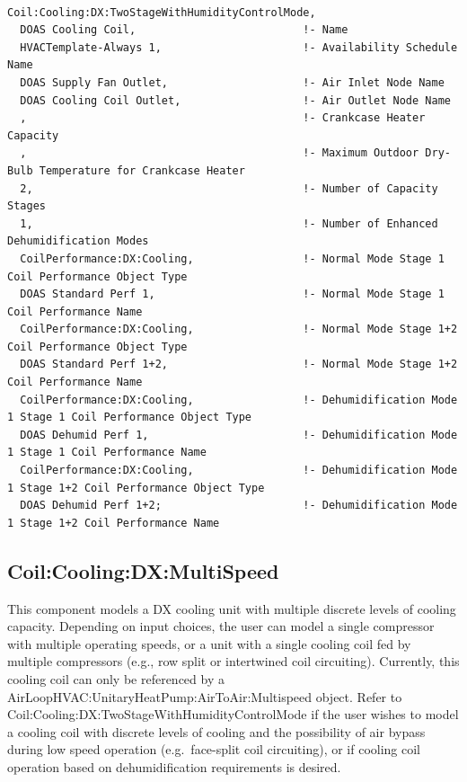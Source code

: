 \begin{lstlisting}

Coil:Cooling:DX:TwoStageWithHumidityControlMode,
  DOAS Cooling Coil,                          !- Name
  HVACTemplate-Always 1,                      !- Availability Schedule Name
  DOAS Supply Fan Outlet,                     !- Air Inlet Node Name
  DOAS Cooling Coil Outlet,                   !- Air Outlet Node Name
  ,                                           !- Crankcase Heater Capacity
  ,                                           !- Maximum Outdoor Dry-Bulb Temperature for Crankcase Heater
  2,                                          !- Number of Capacity Stages
  1,                                          !- Number of Enhanced Dehumidification Modes
  CoilPerformance:DX:Cooling,                 !- Normal Mode Stage 1 Coil Performance Object Type
  DOAS Standard Perf 1,                       !- Normal Mode Stage 1 Coil Performance Name
  CoilPerformance:DX:Cooling,                 !- Normal Mode Stage 1+2 Coil Performance Object Type
  DOAS Standard Perf 1+2,                     !- Normal Mode Stage 1+2 Coil Performance Name
  CoilPerformance:DX:Cooling,                 !- Dehumidification Mode 1 Stage 1 Coil Performance Object Type
  DOAS Dehumid Perf 1,                        !- Dehumidification Mode 1 Stage 1 Coil Performance Name
  CoilPerformance:DX:Cooling,                 !- Dehumidification Mode 1 Stage 1+2 Coil Performance Object Type
  DOAS Dehumid Perf 1+2;                      !- Dehumidification Mode 1 Stage 1+2 Coil Performance Name
\end{lstlisting}

\subsection{Coil:Cooling:DX:MultiSpeed}\label{coilcoolingdxmultispeed}

This component models a DX cooling unit with multiple discrete levels of cooling capacity. Depending on input choices, the user can model a single compressor with multiple operating speeds, or a unit with a single cooling coil fed by multiple compressors (e.g., row split or intertwined coil circuiting). Currently, this cooling coil can only be referenced by a AirLoopHVAC:UnitaryHeatPump:AirToAir:Multispeed object. Refer to Coil:Cooling:DX:TwoStageWithHumidityControlMode if the user wishes to model a cooling coil with discrete levels of cooling and the possibility of air bypass during low speed operation (e.g.~face-split coil circuiting), or if cooling coil operation based on dehumidification requirements is desired.

